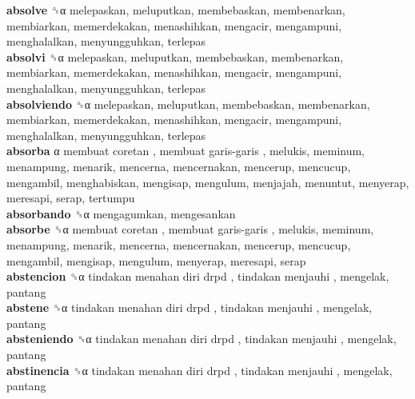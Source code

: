 \textbf{absolve} ␝α  melepaskan, meluputkan, membebaskan, membenarkan, membiarkan, memerdekakan, menashihkan, mengacir, mengampuni, menghalalkan, menyungguhkan, terlepas  \\
\textbf{absolvi} ␝α  melepaskan, meluputkan, membebaskan, membenarkan, membiarkan, memerdekakan, menashihkan, mengacir, mengampuni, menghalalkan, menyungguhkan, terlepas  \\
\textbf{absolviendo} ␝α  melepaskan, meluputkan, membebaskan, membenarkan, membiarkan, memerdekakan, menashihkan, mengacir, mengampuni, menghalalkan, menyungguhkan, terlepas  \\
\textbf{absorba} α   membuat coretan ,  membuat garis-garis , melukis, meminum, menampung, menarik, mencerna, mencernakan, mencerup, mencucup, mengambil, menghabiskan, mengisap, mengulum, menjajah, menuntut, menyerap, meresapi, serap, tertumpu  \\
\textbf{absorbando} ␝α  mengagumkan, mengesankan  \\
\textbf{absorbe} ␝α   membuat coretan ,  membuat garis-garis , melukis, meminum, menampung, menarik, mencerna, mencernakan, mencerup, mencucup, mengambil, mengisap, mengulum, menyerap, meresapi, serap  \\
\textbf{abstencion} ␝α   tindakan menahan diri drpd ,  tindakan menjauhi , mengelak, pantang  \\
\textbf{abstene} ␝α   tindakan menahan diri drpd ,  tindakan menjauhi , mengelak, pantang  \\
\textbf{absteniendo} ␝α   tindakan menahan diri drpd ,  tindakan menjauhi , mengelak, pantang  \\
\textbf{abstinencia} ␝α   tindakan menahan diri drpd ,  tindakan menjauhi , mengelak, pantang  \\
